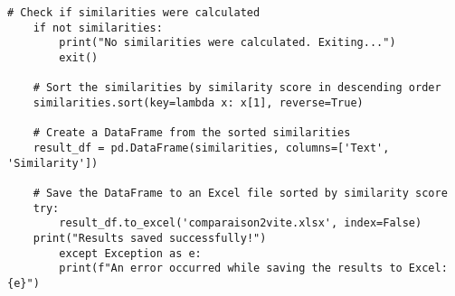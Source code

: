 \begin{lstlisting}[breaklines=true]
	# Check if similarities were calculated
	if not similarities:
		print("No similarities were calculated. Exiting...")
		exit()
	
	# Sort the similarities by similarity score in descending order
	similarities.sort(key=lambda x: x[1], reverse=True)
	
	# Create a DataFrame from the sorted similarities
	result_df = pd.DataFrame(similarities, columns=['Text', 'Similarity'])
	
	# Save the DataFrame to an Excel file sorted by similarity score
	try:
		result_df.to_excel('comparaison2vite.xlsx', index=False)
	print("Results saved successfully!")
		except Exception as e:
		print(f"An error occurred while saving the results to Excel: {e}")
\end{lstlisting}